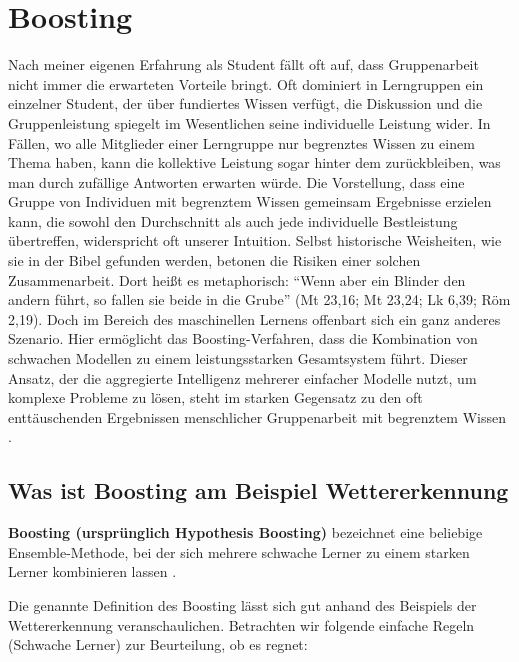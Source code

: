 \section{Boosting}
Nach meiner eigenen Erfahrung als Student fällt oft auf, dass Gruppenarbeit nicht immer die erwarteten Vorteile bringt. Oft dominiert in Lerngruppen ein einzelner Student, der über fundiertes Wissen verfügt, die Diskussion und die Gruppenleistung spiegelt im Wesentlichen seine individuelle Leistung wider. 
\newline
In Fällen, wo alle Mitglieder einer Lerngruppe nur begrenztes Wissen zu einem Thema haben, kann die kollektive Leistung sogar hinter dem zurückbleiben, was man durch zufällige Antworten erwarten würde. Die Vorstellung, dass eine Gruppe von Individuen mit begrenztem Wissen gemeinsam Ergebnisse erzielen kann, die sowohl den Durchschnitt als auch jede individuelle Bestleistung übertreffen, widerspricht oft unserer Intuition. Selbst historische Weisheiten, wie sie in der Bibel gefunden werden, betonen die Risiken einer solchen Zusammenarbeit. Dort heißt es metaphorisch: ``Wenn aber ein Blinder den andern führt, so fallen sie beide in die Grube'' (Mt 23,16; Mt 23,24; Lk 6,39; Röm 2,19).
\newline
\newline
Doch im Bereich des maschinellen Lernens offenbart sich ein ganz anderes Szenario. Hier ermöglicht das Boosting-Verfahren, dass die Kombination von schwachen Modellen zu einem leistungsstarken Gesamtsystem führt. Dieser Ansatz, der die aggregierte Intelligenz mehrerer einfacher Modelle nutzt, um komplexe Probleme zu lösen, steht im starken Gegensatz zu den oft enttäuschenden Ergebnissen menschlicher Gruppenarbeit mit begrenztem Wissen \cite[S.~3]{SchapireFreund2012}.

\subsection{Was ist Boosting am Beispiel Wettererkennung}
\begin{mdframed}
    \textbf{Boosting (ursprünglich Hypothesis Boosting)} bezeichnet eine beliebige Ensemble-Methode, bei der sich mehrere schwache Lerner zu einem starken Lerner kombinieren lassen \textcite[S.~191]{Geron2018}.
\end{mdframed}

Die genannte Definition des Boosting lässt sich gut anhand des Beispiels der Wettererkennung veranschaulichen. Betrachten wir folgende einfache Regeln (Schwache Lerner) zur Beurteilung, ob es regnet:

